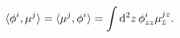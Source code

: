 \begin{equation}
\langle\phi^i,\mu^j\rangle =  \langle\mu^j,\phi^i\rangle =\int{\rm
d}^2 z \, \phi^i_{zz} \mu_{\bar z}^{jz} .
\end{equation}

